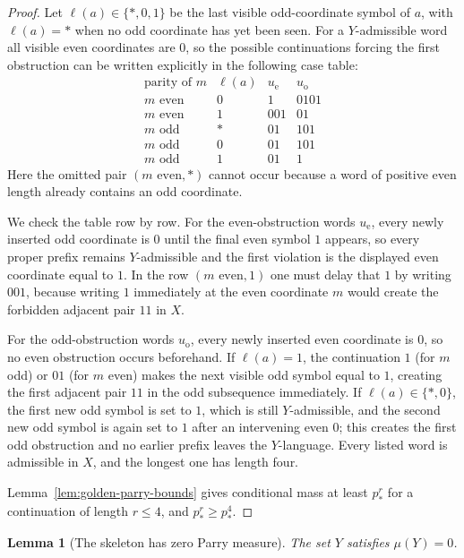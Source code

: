 \documentclass{etds}%
\numberwithin{equation}{section}
\theoremstyle{plain}
\newtheorem{lemma}[theorem]{Lemma}
\theoremstyle{definition}
\theoremstyle{remark}
\begin{document}
\begin{proof}
Let $\ell(a)\in\{\ast,0,1\}$ be the last visible odd-coordinate symbol of $a$,
with $\ell(a)=\ast$ when no odd coordinate has yet been seen.  For a
$Y$-admissible word all visible even coordinates are $0$, so the possible
continuations forcing the first obstruction can be written explicitly in the
following case table:
\[
\begin{array}{c|c|c|c}
\text{parity of }m & \ell(a) & u_{\mathrm e} & u_{\mathrm o}\\
\hline
m\text{ even} & 0 & 1 & 0101\\
m\text{ even} & 1 & 001 & 01\\
m\text{ odd} & \ast & 01 & 101\\
m\text{ odd} & 0 & 01 & 101\\
m\text{ odd} & 1 & 01 & 1
\end{array}
\]
Here the omitted pair $(m\text{ even},\ast)$ cannot occur because a word of
positive even length already contains an odd coordinate.

We check the table row by row.  For the even-obstruction words
$u_{\mathrm e}$, every newly inserted odd coordinate is $0$ until the final
even symbol $1$ appears, so every proper prefix remains $Y$-admissible and the
first violation is the displayed even coordinate equal to $1$.  In the row
$(m\text{ even},1)$ one must delay that $1$ by writing $001$, because writing
$1$ immediately at the even coordinate $m$ would create the forbidden adjacent
pair $11$ in $X$.

For the odd-obstruction words $u_{\mathrm o}$, every newly inserted even
coordinate is $0$, so no even obstruction occurs beforehand.  If
$\ell(a)=1$, the continuation $1$ (for $m$ odd) or $01$ (for $m$ even) makes
the next visible odd symbol equal to $1$, creating the first adjacent pair
$11$ in the odd subsequence immediately.  If $\ell(a)\in\{\ast,0\}$, the first
new odd symbol is set to $1$, which is still $Y$-admissible, and the second new
odd symbol is again set to $1$ after an intervening even $0$; this creates the
first odd obstruction and no earlier prefix leaves the $Y$-language.  Every
listed word is admissible in $X$, and the longest one has length four.

Lemma~\ref{lem:golden-parry-bounds}
gives conditional mass at least $p_*^r$ for a continuation of length
$r\le 4$, and $p_*^r\ge p_*^4$.
\end{proof}

\begin{lemma}[The skeleton has zero Parry measure]
\label{lem:golden-y-null}
The set $Y$ satisfies $\mu(Y)=0$.
\end{lemma}
\end{document}
